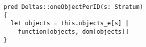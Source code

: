 \lstset{frame=tb, aboveskip=12pt, belowskip=-3pt, breaklines=true, basicstyle=\small\ttfamily, tabsize=2, mathescape=true}
\begin{lstlisting}[caption={base\_deltas.als, lines 53-57}, label=alloy:oneconstituent, captionpos=b]
pred Deltas::oneObjectPerID(s: Stratum)
{
  let objects = this.objects_e[s] |
    function[objects, dom[objects]]
}
\end{lstlisting}
